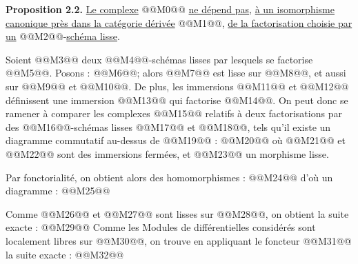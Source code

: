 
\textbf{Proposition 2.2.} \uline{Le complexe} @@M0@@ \uline{ne dépend pas}, \uline{à un isomorphisme canonique près dans la catégorie dérivée} @@M1@@, \uline{de la factorisation choisie par un} @@M2@@-\uline{schéma lisse}.

Soient @@M3@@ deux @@M4@@-schémas lisses par lesquels se factorise @@M5@@. Posons : @@M6@@; alors @@M7@@ est lisse sur @@M8@@, et aussi sur @@M9@@ et @@M10@@. De plus, les immersions @@M11@@ et @@M12@@ définissent une immersion @@M13@@ qui factorise @@M14@@. On peut donc se ramener à comparer les complexes @@M15@@ relatifs à deux factorisations par des @@M16@@-schémas lisses @@M17@@ et @@M18@@, tels qu'il existe un diagramme commutatif au-dessus de @@M19@@ :
@@M20@@
où @@M21@@ et @@M22@@ sont des immersions fermées, et @@M23@@ un morphisme lisse.

Par fonctorialité, on obtient alors des homomorphismes :
@@M24@@
d'où un diagramme :
@@M25@@

Comme @@M26@@ et @@M27@@ sont lisses sur @@M28@@, on obtient la suite exacte :
@@M29@@
Comme les Modules de différentielles considérés sont localement libres sur @@M30@@, on trouve en appliquant le foncteur @@M31@@ la suite exacte :
@@M32@@
